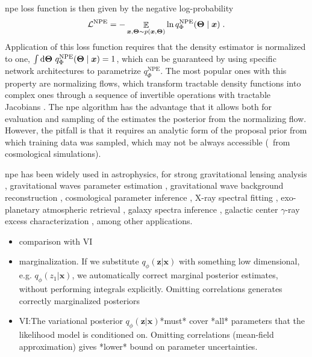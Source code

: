 \Gls*{npe} loss function is then given by the negative log-probability
%
\begin{equation}
	\mathcal{L}^\text{NPE}=-\mathop{\mathbb{E}}\limits_{\bm{x}, \bm{\Theta} \sim p(\bm{x}, \bm{\Theta})} \ln q^\text{NPE}_\Phi(\bm{\Theta} \mid \bm{x}) \;.
\end{equation}
%
Application of this loss function requires that the density estimator is normalized to one, $\int \dd\bm{\Theta}\ q^\text{NPE}_\Phi(\bm{\Theta} \mid \bm{x})=1$, which can be guaranteed by using specific network architectures to parametrize $q^\text{NPE}_\Phi$. The most popular ones with this property are normalizing flows, which transform tractable density functions into complex ones through a sequence of invertible operations with tractable Jacobians \cite{kobyzev2020normalizing, papamakarios2021normalizing}. The \gls*{npe} algorithm has the advantage that it allows both for evaluation and sampling of the estimates the posterior from the normalizing flow. However, the pitfall is that it requires an analytic form of the proposal prior from which training data was sampled, which may not be always accessible (\eg\ from cosmological simulations).

\Gls*{npe} has been widely used in astrophysics, for strong gravitational lensing analysis \cite{Wagner-Carena:2020yun, Wagner-Carena:2022mrn, wagnercarena2024strong}, gravitational waves parameter estimation \cite{Dax:2021tsq, Crisostomi:2023tle, kolmus2024tuning}, gravitational wave background reconstruction \cite{Dimitriou:2023knw}, cosmological parameter inference \cite{Tucci:2023bag}, X-ray spectral fitting \cite{Barret:2024kvc}, exo-planetary atmospheric retrieval \cite{vasist2023neural}, galaxy spectra inference \cite{Hahn:2022nda, khullar2022digs}, galactic center $\gamma$-ray excess characterization \cite{Mishra-Sharma:2021oxe}, among other applications.

\todo{}
\begin{itemize}
	\item comparison with VI
	\item \cite{ambrogioni2019forward} marginalization. If we substitute $q_\phi(\mathbf z|\mathbf x)$ with something low dimensional, e.g. $q_\phi(z_1|\mathbf x)$, we automatically correct marginal posterior estimates, without performing integrals explicitly. Omitting correlations generates correctly marginalized posteriors
	\item VI:The variational posterior $q_\phi(\mathbf z|\mathbf x)$*must* cover *all* parameters that the likelihood model is conditioned on. Omitting correlations (mean-field approximation) gives *lower* bound on parameter uncertainties.
\end{itemize}


